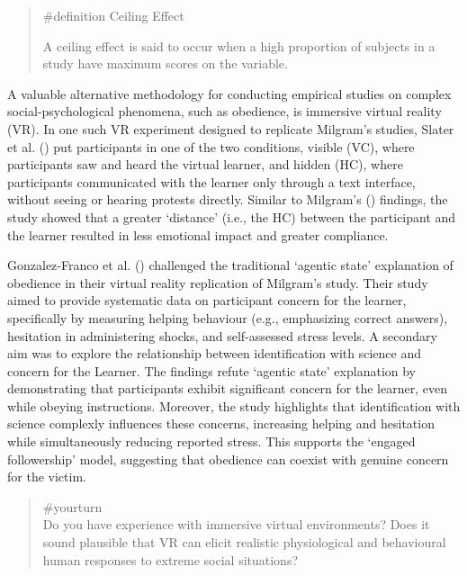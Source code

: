 \documentclass[
  letterpaper,
]{book}
\begin{document}
\begin{quote}
\label{def-ceilingeffect}{\#definition} Ceiling Effect

A ceiling effect is said to occur when a high proportion of subjects in
a study have maximum scores on the variable.
\end{quote}

A valuable alternative methodology for conducting empirical studies on
complex social-psychological phenomena, such as obedience, is immersive
virtual reality (VR). In one such VR experiment designed to replicate
Milgram's studies, Slater et al.
() put participants in one of
the two conditions, visible (VC), where participants saw and heard the
virtual learner, and hidden (HC), where participants communicated with
the learner only through a text interface, without seeing or hearing
protests directly. Similar to Milgram's
() findings, the study
showed that a greater `distance' (i.e., the HC) between the participant
and the learner resulted in less emotional impact and greater
compliance.

Gonzalez-Franco et al.
() challenged the
traditional `agentic state' explanation of obedience in their virtual
reality replication of Milgram's study. Their study aimed to provide
systematic data on participant concern for the learner, specifically by
measuring helping behaviour (e.g., emphasizing correct answers),
hesitation in administering shocks, and self-assessed stress levels. A
secondary aim was to explore the relationship between identification
with science and concern for the Learner. The findings refute `agentic
state' explanation by demonstrating that participants exhibit
significant concern for the learner, even while obeying instructions.
Moreover, the study highlights that identification with science
complexly influences these concerns, increasing helping and hesitation
while simultaneously reducing reported stress. This supports the
`engaged followership' model, suggesting that obedience can coexist with
genuine concern for the victim.

\begin{quote}
{\#yourturn}\\
Do you have experience with immersive virtual environments? Does it
sound plausible that VR can elicit realistic physiological and
behavioural human responses to extreme social situations?
\end{quote}
\end{document}
